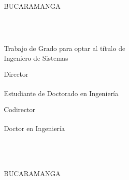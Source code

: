 
\thispagestyle{empty}

\begin{center}

\MakeUppercase{\titulo} \vspace{7cm}

\MakeUppercase{\autor}\\
\vspace{7cm}

\MakeUppercase{\universidad}\\
\MakeUppercase{\facultad}\\
\MakeUppercase{\escuela}\\
BUCARAMANGA\\
\fecha\\

\end{center}


\newpage
\thispagestyle{empty}

\begin{center}

\MakeUppercase{\titulo} \vspace{2.3cm}

\MakeUppercase{\autor}\\
\vspace{2.3cm}

Trabajo de Grado para optar al título de\\
Ingeniero de Sistemas\\\vspace{1.5cm}

Director\\
\director\\
Estudiante de Doctorado en Ingeniería \vspace{0.5cm}

Codirector\\
\codirector\\
Doctor en Ingeniería \vspace{1.5cm}

\MakeUppercase{\universidad}\\
\MakeUppercase{\facultad}\\
\MakeUppercase{\escuela}\\
BUCARAMANGA\\
\fecha\\

\end{center}

